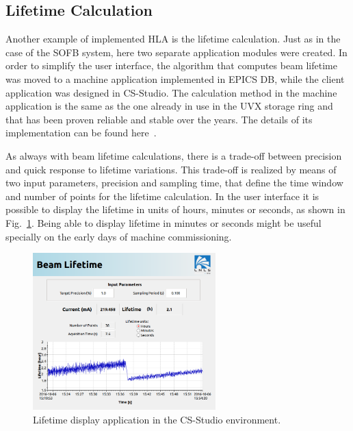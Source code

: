 \subsection{Lifetime Calculation}

Another example of implemented HLA is the lifetime calculation. Just as in the case of the SOFB system, here two separate application modules were created. In order to simplify the user interface, the algorithm that computes beam lifetime was moved to a machine application implemented in EPICS DB, while the client application was designed in CS-Studio. The calculation method in the machine application is the same as the one already in use in the UVX storage ring and that has been proven reliable and stable over the years. The details of its implementation can be found here~\cite{lifetime}.

As always with beam lifetime calculations, there is a trade-off between precision and quick response to lifetime variations. This trade-off is realized by means of two input parameters, precision and sampling time, that define the time window and number of points for the lifetime calculation. In the user interface it is possible to display the lifetime in units of hours, minutes or seconds, as shown in Fig.~\ref{fig:lifetimef1}. Being able to display lifetime in minutes or seconds might be useful specially on the early days of machine commissioning.

\begin{figure}[!htb]
   \centering
   \includegraphics*[width=200pt]{WEPOPRPO22f2}
   \caption{Lifetime display application in the CS-Studio environment.}
   \label{fig:lifetimef1}
\end{figure}